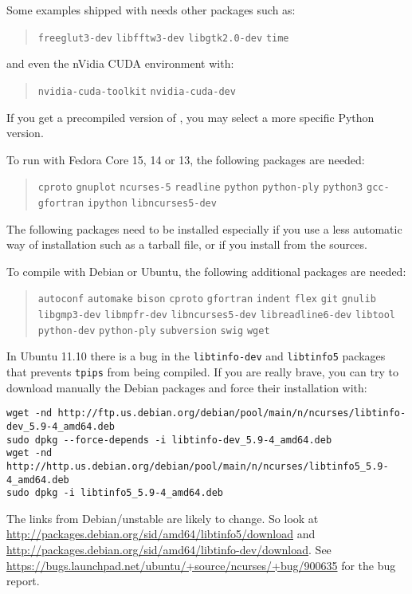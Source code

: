\documentclass[a4paper]{article}
\begin{document}
Some examples shipped with \Apfa needs other packages such as:
\begin{quote}
  \texttt{freeglut3-dev} \texttt{libfftw3-dev} \texttt{libgtk2.0-dev}
  \texttt{time}
\end{quote}
and even the nVidia CUDA environment with:
\begin{quote}
  \texttt{nvidia-cuda-toolkit} \texttt{nvidia-cuda-dev}
\end{quote}


If you get a precompiled version of \Apfa, you may select a more specific
Python version.

To run \Apfa with Fedora Core 15, 14 or 13, the following packages are needed:
\begin{quote}
  \texttt{cproto} \texttt{gnuplot} \texttt{ncurses-5}
  \texttt{readline} \texttt{python} \texttt{python-ply}
  \texttt{python3} \texttt{gcc-gfortran} \texttt{ipython}
  \texttt{libncurses5-dev}
\end{quote}

The following packages need to be installed especially if you use a less
automatic way of installation such as a tarball file, or if you install
from the sources.


To compile \Apfa with Debian or Ubuntu, the following additional
packages are needed:
\begin{quote}
  \texttt{autoconf} \texttt{automake} \texttt{bison} \texttt{cproto}
  \texttt{gfortran} \texttt{indent} \texttt{flex} \texttt{git}
  \texttt{gnulib} \texttt{libgmp3-dev} \texttt{libmpfr-dev}
  \texttt{libncurses5-dev} \texttt{libreadline6-dev} \texttt{libtool}
  \texttt{python-dev} \texttt{python-ply} \texttt{subversion}
  \texttt{swig} \texttt{wget}
\end{quote}
In Ubuntu 11.10 there is a bug in the \texttt{libtinfo-dev} and
\texttt{libtinfo5} packages that prevents \texttt{tpips} from being
compiled. If you are really brave, you can try to download manually the
Debian packages and force their installation with: {\small
\begin{verbatim}
wget -nd http://ftp.us.debian.org/debian/pool/main/n/ncurses/libtinfo-dev_5.9-4_amd64.deb
sudo dpkg --force-depends -i libtinfo-dev_5.9-4_amd64.deb
wget -nd http://http.us.debian.org/debian/pool/main/n/ncurses/libtinfo5_5.9-4_amd64.deb
sudo dpkg -i libtinfo5_5.9-4_amd64.deb
\end{verbatim}
}%
The links from Debian/unstable are likely to change. So look at
\url{http://packages.debian.org/sid/amd64/libtinfo5/download} and
\url{http://packages.debian.org/sid/amd64/libtinfo-dev/download}.  See
\url{https://bugs.launchpad.net/ubuntu/+source/ncurses/+bug/900635} for
the bug report.
\end{document}
